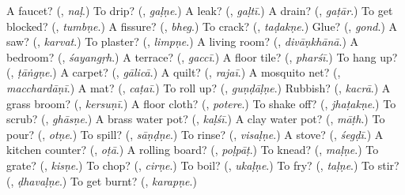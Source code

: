 \begin{tcolorbox}[breakable,colback=teal!4,colframe=teal!35!black,title={Before you move on}]
A faucet? (\textbf{}, \emph{naḷ}.) To drip? (\textbf{}, \emph{gaḷṇe}.) A leak? (\textbf{}, \emph{gaḷtī}.) A drain? (\textbf{}, \emph{gaṭār}.) To get blocked? (\textbf{}, \emph{tumbṇe}.) A fissure? (\textbf{}, \emph{bheg}.) To crack? (\textbf{}, \emph{taḍakṇe}.) Glue? (\textbf{}, \emph{gond}.) A saw? (\textbf{}, \emph{karvat}.) To plaster? (\textbf{}, \emph{limpṇe}.) A living room? (\textbf{}, \emph{divāṇkhānā}.) A bedroom? (\textbf{}, \emph{śayangṛh}.) A terrace? (\textbf{}, \emph{gaccī}.) A floor tile? (\textbf{}, \emph{pharśī}.) To hang up? (\textbf{}, \emph{ṭāṅgṇe}.) A carpet? (\textbf{}, \emph{gālicā}.) A quilt? (\textbf{}, \emph{rajaī}.) A mosquito net? (\textbf{}, \emph{macchardāṇī}.) A mat? (\textbf{}, \emph{caṭaī}.) To roll up? (\textbf{}, \emph{guṇḍāḷṇe}.) Rubbish? (\textbf{}, \emph{kacrā}.) A grass broom? (\textbf{}, \emph{kersuṇī}.) A floor cloth? (\textbf{}, \emph{potere}.) To shake off? (\textbf{}, \emph{jhaṭakṇe}.) To scrub? (\textbf{}, \emph{ghāsṇe}.) A brass water pot? (\textbf{}, \emph{kaḷśī}.) A clay water pot? (\textbf{}, \emph{māṭh}.) To pour? (\textbf{}, \emph{otṇe}.) To spill? (\textbf{}, \emph{sāṇḍṇe}.) To rinse? (\textbf{}, \emph{visaḷṇe}.) A stove? (\textbf{}, \emph{śegḍī}.) A kitchen counter? (\textbf{}, \emph{oṭā}.) A rolling board? (\textbf{}, \emph{poḷpāṭ}.) To knead? (\textbf{}, \emph{maḷṇe}.) To grate? (\textbf{}, \emph{kisṇe}.) To chop? (\textbf{}, \emph{cirṇe}.) To boil? (\textbf{}, \emph{ukaḷṇe}.) To fry? (\textbf{}, \emph{taḷṇe}.) To stir? (\textbf{}, \emph{ḍhavaḷṇe}.) To get burnt? (\textbf{}, \emph{karapṇe}.)
\end{tcolorbox}
